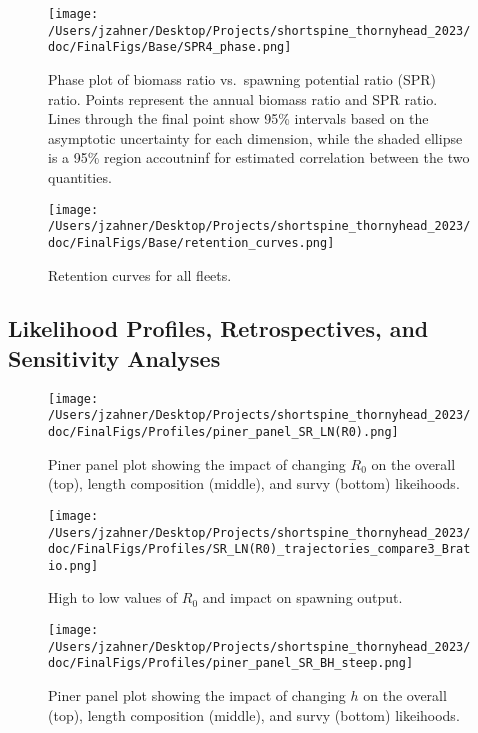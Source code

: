 \documentclass[11pt,
  english,
  letterpaper,
]{article}
\begin{document}
\begin{figure}
\centering
\texttt{[image: /Users/jzahner/Desktop/Projects/shortspine\_thornyhead\_2023/doc/FinalFigs/Base/SPR4\_phase.png]}
\caption{Phase plot of biomass ratio vs.~spawning potential ratio (SPR) ratio. Points represent the annual biomass ratio and SPR ratio. Lines through the final point show 95\% intervals based on the asymptotic uncertainty for each dimension, while the shaded ellipse is a 95\% region accoutninf for estimated correlation between the two quantities.\label{fig:phase_diagram}}
\end{figure}

\begin{figure}
\centering
\texttt{[image: /Users/jzahner/Desktop/Projects/shortspine\_thornyhead\_2023/doc/FinalFigs/Base/retention\_curves.png]}
\caption{Retention curves for all fleets.\label{fig:retencurvs}}
\end{figure}

\clearpage

\hypertarget{likelihood-profiles-retrospectives-and-sensitivity-analyses}{%
\subsection{Likelihood Profiles, Retrospectives, and Sensitivity Analyses}\label{likelihood-profiles-retrospectives-and-sensitivity-analyses}}

\begin{figure}
\centering
\texttt{[image: /Users/jzahner/Desktop/Projects/shortspine\_thornyhead\_2023/doc/FinalFigs/Profiles/piner\_panel\_SR\_LN(R0).png]}
\caption{Piner panel plot showing the impact of changing \(R_0\) on the overall (top), length composition (middle), and survy (bottom) likeihoods.\label{fig:R0_prof}}
\end{figure}

\begin{figure}
\centering
\texttt{[image: /Users/jzahner/Desktop/Projects/shortspine\_thornyhead\_2023/doc/FinalFigs/Profiles/SR\_LN(R0)\_trajectories\_compare3\_Bratio.png]}
\caption{High to low values of \(R_0\) and impact on spawning output.\label{fig:R0_spawnout}}
\end{figure}

\begin{figure}
\centering
\texttt{[image: /Users/jzahner/Desktop/Projects/shortspine\_thornyhead\_2023/doc/FinalFigs/Profiles/piner\_panel\_SR\_BH\_steep.png]}
\caption{Piner panel plot showing the impact of changing \(h\) on the overall (top), length composition (middle), and survy (bottom) likeihoods.\label{fig:h_piner_prof}}
\end{figure}
\end{document}
